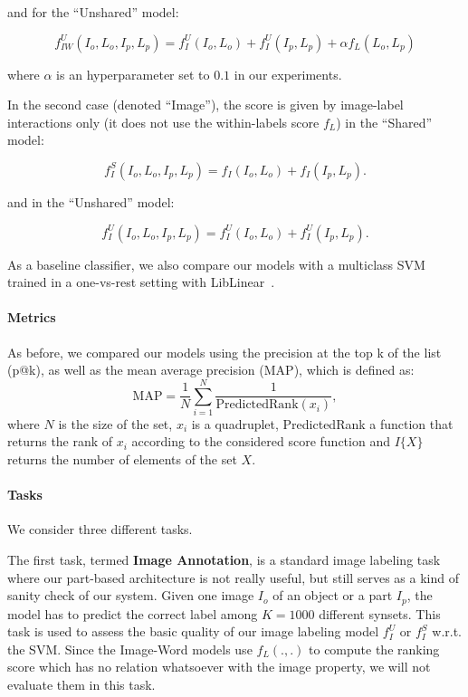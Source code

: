 and for the ``Unshared'' model:

\[
f_{IW}^U(I_o,L_o,I_p,L_p) = f_I^U(I_o,L_o) + f_I^U(I_p,L_p) + \alpha f_{L}(L_o,L_p)
\]


where $\alpha$ is an hyperparameter set to $0.1$ in our experiments.


In the second case (denoted ``Image''), the score is given by image-label interactions only
(it does not use the within-labels score $f_L$) in the ``Shared'' model:

\[
f_I^S(I_o,L_o,I_p,L_p) = f_I(I_o,L_o) + f_I(I_p,L_p) .
\]

and in the ``Unshared'' model:

\[
f_I^U(I_o,L_o,I_p,L_p) = f_I^U(I_o,L_o) + f_I^U(I_p,L_p) .
\]

As a baseline classifier, we also compare our models with a multiclass SVM
trained in a one-vs-rest setting with LibLinear~\cite{liblinear}.




\paragraph{Metrics}

As before, we compared our models using the precision at the top k of the list
(p@k), as well as the mean average precision (MAP), which is defined as:
\[
  \textrm{MAP} = \frac{1}{N} \sum_{i=1}^{N} \dfrac{1}{\textrm{PredictedRank}(x_i)},
\]
where $N$ is the size of the set, $x_i$ is a quadruplet, PredictedRank
a function that returns the rank of $x_i$ according to the considered
score function and $I\{X\}$ returns the number of elements of the set $X$.

\paragraph{Tasks}%
We consider three different tasks.

The first task, termed {\bf Image Annotation}, is a standard image labeling
task where our part-based architecture is not really useful, but still serves
as a kind of sanity check of our system. Given one image $I_o$ of an object or
a part $I_p$, the model has to predict the correct label among $K=1000$
different synsets.
%
This task is used to assess the basic quality of our image labeling model
$f_I^U$ or $f_I^S$ w.r.t. the SVM.  Since the Image-Word models use $f_L(.,.)$
to compute the ranking score which has no relation whatsoever with the image
property, we will not evaluate them in this task.

